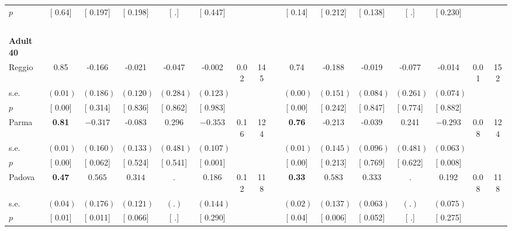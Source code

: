 \begin{longtable}{L{8em} c c c c c c c p{1em} c c c c c c c}
\quad \quad \quad \quad $ p$ & [     0.64] & [    0.197] & [    0.198] & [        .] & [    0.447] & & & & [     0.14] & [    0.212] & [    0.138] & [        .] & [    0.230] & &  \\[1em]
~\\[1em]
\quad \quad \textbf{Adult 40} & & & & & & & & & & & & & & & \\* 
\quad \quad \quad Reggio& 0.85 &    -0.166 &    -0.021 &    -0.047 &    -0.002 &      0.02 &       145 & & 0.74 &    -0.188 &    -0.019 &    -0.077 &    -0.014 &      0.01 &       152  \\*
\quad \quad \quad \quad s.e.& $ (     0.01)$ & $ (    0.186)$ & $ (    0.120)$ & $ (    0.284)$ & $ (    0.123)$ & & & & $ (     0.00)$ & $ (    0.151)$ & $ (    0.084)$ & $ (    0.261)$ & $ (    0.074)$ & &  \\*
\quad \quad \quad \quad $ p$ & [     0.00] & [    0.314] & [    0.836] & [    0.862] & [    0.983] & & & & [     0.00] & [    0.242] & [    0.847] & [    0.774] & [    0.882] & &  \\[1em]
\quad \quad \quad Parma& \textbf{     0.81} & $ \mathbf{   -0.317}$ &    -0.083 &     0.296 & $ \mathbf{   -0.353}$ &      0.16 &       124 & & \textbf{     0.76} &    -0.213 &    -0.039 &     0.241 & $ \mathbf{   -0.293}$ &      0.08 &       124  \\*
\quad \quad \quad \quad s.e.& $ (     0.01)$ & $ (    0.160)$ & $ (    0.133)$ & $ (    0.481)$ & $ (    0.107)$ & & & & $ (     0.01)$ & $ (    0.145)$ & $ (    0.096)$ & $ (    0.481)$ & $ (    0.063)$ & &  \\*
\quad \quad \quad \quad $ p$ & [     0.00] & [    0.062] & [    0.524] & [    0.541] & [    0.001] & & & & [     0.00] & [    0.213] & [    0.769] & [    0.622] & [    0.008] & &  \\[1em]
\quad \quad \quad Padova& \textbf{     0.47} & $ \mathbf{    0.565}$ & $ \mathbf{    0.314}$ &         . &     0.186 &      0.12 &       118 & & \textbf{     0.33} & $ \mathbf{    0.583}$ & $ \mathbf{    0.333}$ &         . &     0.192 &      0.08 &       118  \\*
\quad \quad \quad \quad s.e.& $ (     0.04)$ & $ (    0.176)$ & $ (    0.121)$ & $ (        .)$ & $ (    0.144)$ & & & & $ (     0.02)$ & $ (    0.137)$ & $ (    0.063)$ & $ (        .)$ & $ (    0.075)$ & &  \\*
\quad \quad \quad \quad $ p$ & [     0.01] & [    0.011] & [    0.066] & [        .] & [    0.290] & & & & [     0.04] & [    0.006] & [    0.052] & [        .] & [    0.275] & &  \\[1em]

\end{longtable}
